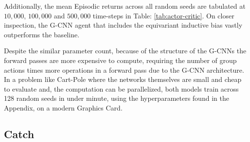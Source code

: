 Additionally, the mean Episodic returns across all random seeds are tabulated at $10,000$, $100,000$ and $500,000$ time-steps in Table: \ref{tab:actor-critic}. On closer inspection, the G-CNN agent that includes the equivariant inductive bias vastly outperforms the baseline.

Despite the similar parameter count, because of the structure of the G-CNNs the forward passes are more expensive to compute, requiring the number of group actions times more operations in a forward pass due to the G-CNN architecture. In a problem like Cart-Pole where the networks themselves are small and cheap to evaluate and, the computation can be parallelized, both models train across 128 random seeds in under minute, using the hyperparameters found in the Appendix, on a modern Graphics Card.

\subsection{Catch}







